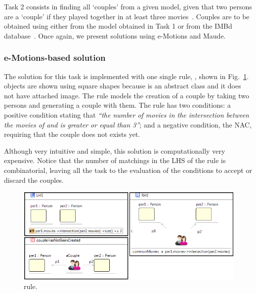 
Task 2 consists in finding all `couples' from a given model, given that two persons are a `couple' if they played together in at least three movies~\cite{imdbcase}. Couples are to be obtained using either from the model obtained in Task 1 or from the IMBd database~\cite{imdbsources}. Once again, we present solutions using e-Motions and Maude.

\subsubsection{e-Motions-based solution}

The solution for this task is implemented with one single rule, , shown in Fig.~\ref{fig:createCouple}.  objects are shown using square shapes because  is an abstract class and it does not have attached image. The  rule models the creation of a couple by taking two persons and generating a couple with them. The rule has two conditions: a positive condition stating that \textit{``the number of movies in the intersection between the movies of  and  is greater or equal than 3''}; and a negative condition, the  NAC, requiring that the couple does not exists yet. 

Although very intuitive and simple, this solution is computationally very expensive. Notice that the number of matchings in the LHS of the rule is combinatorial, leaving all the task to the evaluation of the conditions to accept or discard the couples. 

\begin{figure}[htp]
  \centering
  \includegraphics[width=\textwidth]{imgs/ruleCouples}
  \caption{ rule.}\label{fig:createCouple}
\end{figure}

